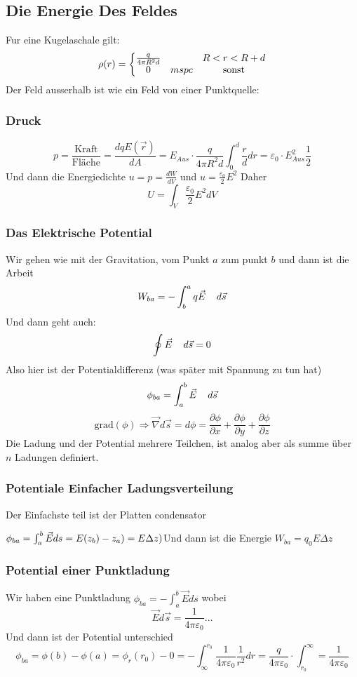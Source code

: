 \documentclass{article}
\newcommand{\mspc}{\hspace{0.4cm}}
\begin{document}
\subsection{Die Energie Des Feldes}Fur eine Kugelaschale gilt:\[\rho(r)=\left\lbrace\begin{matrix}\frac{q}{4\pi R^2d}&\mspc&R<r<R+d\\0&mspc&\text{sonst}\end{matrix}\right.\]
Der Feld ausserhalb ist wie ein Feld von einer Punktquelle:
\subsubsection{Druck}\[p=\frac{\text{Kraft}}{\text{Fläche}}=\frac{dqE(\vec{r})}{dA}=E_{Aus}\cdot\frac{q}{4\pi R^2d}\int_0^d\frac{r}{d}dr=\varepsilon_0\cdot E_{Aus}^2\frac{1}{2}\]
Und dann die Energiedichte $u=p=\frac{dW}{dV}$ und $u=\frac{\varepsilon_0}{2}E^2$ Daher \[U=\int_V\frac{\varepsilon_0}{2}E^2dV\]
\subsubsection{Das Elektrische Potential} Wir gehen wie mit der Gravitation, vom Punkt $a$ zum punkt $b$ und dann ist die Arbeit \[W_{ba}=-\int_b^aq\vec{E}\mspc d\vec{s}\]Und dann geht auch:\[\oint\vec{E}\mspc d\vec{s}=0\]
Also hier ist der Potentialdifferenz (was später mit Spannung zu tun hat) \[ \phi_{ba}=\int_a^b\vec{E}\mspc d\vec{s}\] \[\text{grad}(\phi)\Rightarrow\vec{\nabla}d\vec{s}=d\phi=\frac{\partial\phi}{\partial x}+\frac{\partial\phi}{\partial y}+\frac{\partial\phi}{\partial z}\]
Die Ladung und der Potential mehrere Teilchen, ist analog aber als summe über $n$ Ladungen definiert.
\subsubsection{Potentiale Einfacher Ladungsverteilung} Der Einfachste teil ist der Platten condensator
\begin{multicols}{2}
$\phi_{ba}=\-\int_a^b\vec{E} ds=E(z_b)-z_a)=E\Delta z)$\newline Und dann ist die Energie $W_{ba}=q_0E\Delta z$
\vfill\null\columnbreak
{}
\end{multicols}
\subsubsection{Potential einer Punktladung} Wir haben eine Punktladung $\phi_{ba}=-\int_a^b \vec{E}ds$ wobei \[\vec{E}d\vec{s}=\frac{1}{4\pi \varepsilon_0}...\] Und dann ist der Potential unterschied
\[\phi_{ba}=\phi(b)-\phi(a)=\phi_r(r_0)-0=-\int_\infty^{r_0}\frac{1}{4\pi\varepsilon_0}\frac{1}{r^2}dr=\frac{q}{4\pi\varepsilon_0}\cdot\int_{r_0}^\infty=\frac{1}{4\pi\varepsilon_0}\]
\end{document}

